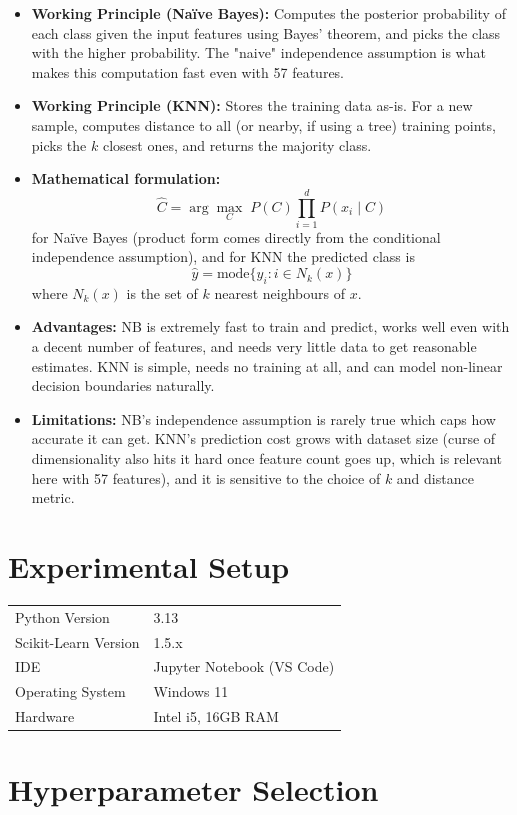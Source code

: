 \documentclass[12pt,a4paper]{article}
\begin{document}
\begin{itemize}
\item \textbf{Working Principle (Na\"ive Bayes):} Computes the posterior probability of each class given the input features using Bayes' theorem, and picks the class with the higher probability. The "naive" independence assumption is what makes this computation fast even with 57 features.
\item \textbf{Working Principle (KNN):} Stores the training data as-is. For a new sample, computes distance to all (or nearby, if using a tree) training points, picks the $k$ closest ones, and returns the majority class.
\item \textbf{Mathematical formulation:}
\[
\hat{C} = \arg\max_{C} \; P(C)\prod_{i=1}^{d} P(x_i \mid C)
\]
for Na\"ive Bayes (product form comes directly from the conditional independence assumption), and for KNN the predicted class is
\[
\hat{y} = \text{mode}\{y_i : i \in N_k(x)\}
\]
where $N_k(x)$ is the set of $k$ nearest neighbours of $x$.
\item \textbf{Advantages:} NB is extremely fast to train and predict, works well even with a decent number of features, and needs very little data to get reasonable estimates. KNN is simple, needs no training at all, and can model non-linear decision boundaries naturally.
\item \textbf{Limitations:} NB's independence assumption is rarely true which caps how accurate it can get. KNN's prediction cost grows with dataset size (curse of dimensionality also hits it hard once feature count goes up, which is relevant here with 57 features), and it is sensitive to the choice of $k$ and distance metric.
\end{itemize}

\section{Experimental Setup}
\begin{tabular}{ll}
\toprule
Python Version & 3.13 \\
Scikit-Learn Version & 1.5.x \\
IDE & Jupyter Notebook (VS Code) \\
Operating System & Windows 11 \\
Hardware & Intel i5, 16GB RAM \\
\bottomrule
\end{tabular}

\section{Hyperparameter Selection}
\end{document}
